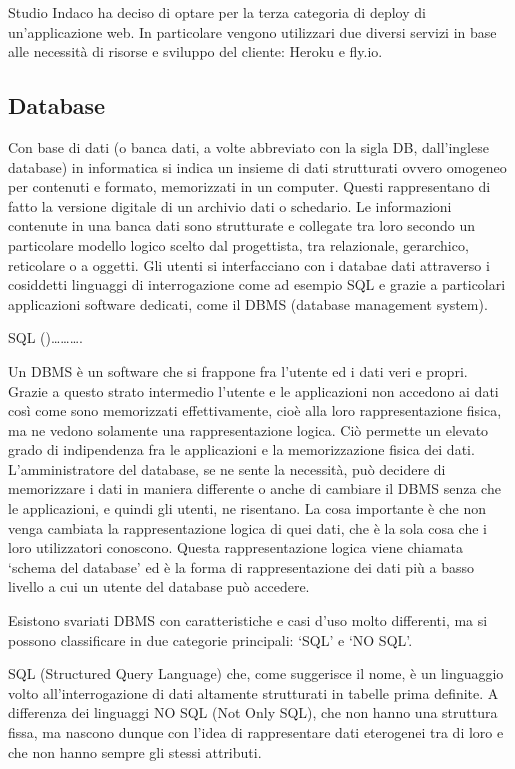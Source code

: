 \documentclass[12pt,a4paper]{article}
\begin{document}
Studio Indaco ha deciso di optare per la terza categoria di deploy di un’applicazione web. In particolare vengono utilizzari due diversi servizi in base alle necessità di risorse e sviluppo del cliente: Heroku e fly.io.

\subsection{Database}
Con base di dati (o banca dati, a volte abbreviato con la sigla DB, dall'inglese database) in informatica si indica un insieme di dati strutturati ovvero omogeneo per contenuti e formato, memorizzati in un computer. Questi rappresentano di fatto la versione digitale di un archivio dati o schedario.
Le informazioni contenute in una banca dati sono strutturate e collegate tra loro secondo un particolare modello logico scelto dal progettista, tra relazionale, gerarchico, reticolare o a oggetti. Gli utenti si interfacciano con i databae dati attraverso i cosiddetti linguaggi di interrogazione come ad esempio SQL e grazie a particolari applicazioni software dedicati, come il DBMS (database management system).

SQL ()……….

Un DBMS è un software che si frappone fra l’utente ed i dati veri e propri. Grazie a questo strato intermedio l’utente e le applicazioni non accedono ai dati così come sono memorizzati effettivamente, cioè alla loro rappresentazione fisica, ma ne vedono solamente una rappresentazione logica. Ciò permette un elevato grado di indipendenza fra le applicazioni e la memorizzazione fisica dei dati. L’amministratore del database, se ne sente la necessità, può decidere di memorizzare i dati in maniera differente o anche di cambiare il DBMS senza che le applicazioni, e quindi gli utenti, ne risentano. La cosa importante è che non venga cambiata la rappresentazione logica di quei dati, che è la sola cosa che i loro utilizzatori conoscono. Questa rappresentazione logica viene chiamata ‘schema del database’ ed è la forma di rappresentazione dei dati più a basso livello a cui un utente del database può accedere.

Esistono svariati DBMS con caratteristiche e casi d’uso molto differenti, ma si possono classificare in due categorie principali: ‘SQL’ e ‘NO SQL’.

SQL (Structured Query Language) che, come suggerisce il nome, è un linguaggio volto all’interrogazione di dati altamente strutturati in tabelle prima definite.
A differenza dei linguaggi NO SQL (Not Only SQL), che non hanno una struttura fissa, ma nascono dunque con l’idea di rappresentare dati eterogenei tra di loro e che non hanno sempre gli stessi attributi.
\end{document}
